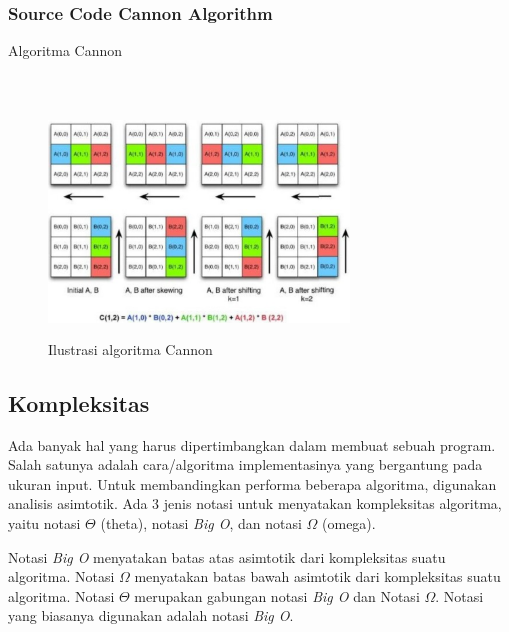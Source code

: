 \documentclass[conference]{IEEEtran}
\begin{document}
\subsubsection{Source Code Cannon Algorithm}
\begin{algorithm}
    \caption{Algoritma Cannon}
    \\
\end{algorithm}

\begin{figure}[h]
    \includegraphics[width = 8cm, height = 6cm]{Ilustrasi_algoritma_cannon.png}
    \centering
    \caption{Ilustrasi algoritma Cannon}
\end{figure}

\subsection{Kompleksitas}
Ada banyak hal yang harus dipertimbangkan dalam membuat sebuah program.
Salah satunya adalah cara/algoritma implementasinya yang bergantung pada ukuran input.
Untuk membandingkan performa beberapa algoritma, digunakan analisis asimtotik.
Ada 3 jenis notasi untuk menyatakan kompleksitas algoritma, yaitu notasi $\Theta$ (theta), notasi \textit{Big O}, dan notasi $\Omega$ (omega).

Notasi \textit{Big O} menyatakan batas atas asimtotik dari kompleksitas suatu algoritma.
Notasi $\Omega$ menyatakan batas bawah asimtotik dari kompleksitas suatu algoritma.
Notasi $\Theta$ merupakan gabungan notasi \textit{Big O} dan Notasi $\Omega$.
Notasi yang biasanya digunakan adalah notasi \textit{Big O}.
\end{document}
